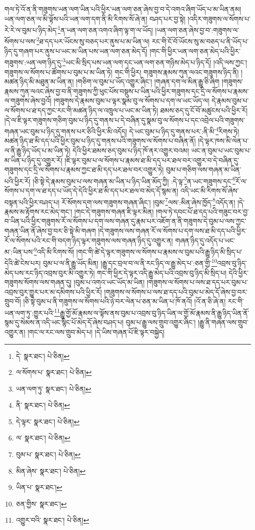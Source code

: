 གལ་ཏེ་འོ་ན་ནི་གཟུགས་ཡན་ལག་ཡིན་པའི་ཕྱིར་ཡན་ལག་ཅན་ཞེས་བྱ་བ་དེ་འགའ་ཞིག་ཡོད་པ་མ་ཡིན་ནམ། ཡན་ལག་ཅན་ལ་མི་ལྟོས་པའི་ཡན་ལག་དག་ནི་མི་རིགས་སོ་ཞེ་ན། བཤད་པར་བྱ་སྟེ། །འདིར་གཟུགས་ལ་སོགས་པ་རེ་རེ་ལ་བུམ་པ་ཉིད་མེད་\footnote{དེ་  སྣར་ཐང་།  པེ་ཅིན། }ན་ཡན་ལག་ཅན་འགའ་ཞིག་ལྟ་ག་ལ་ཡོད། །ཡན་ལག་ཅན་ཞེས་བྱ་བ་:གཟུགས་ལ་སོགས་པ་ལས་\footnote{ལ་སོགས་པ་  སྣར་ཐང་།  པེ་ཅིན། }ཐ་དད་པར་ཡོངས་སུ་བཅད་པར་ནུས་པ་མ་ཡིན་ལ། རང་གི་ངོ་བོ་ཡོངས་སུ་མ་བཅད་པ་ནི་ཡོད་པ་ཉིད་དུ་གཞག་པར་ནུས་པ་ཡང་མ་ཡིན་པས་ཡན་ལག་ཅན་མེད་དོ། །གང་གི་ཕྱིར་ཡན་ལག་ཅན་མེད་པའི་ཕྱིར་གཟུགས་:ཡན་ལག་ཉིད་དུ་\footnote{ཡན་ལག་ཏུ་  སྣར་ཐང་།  པེ་ཅིན། }ཡང་མི་སྲིད་པས་ཡན་ལག་དང་ཡན་ལག་ཅན་གཉིས་མེད་པ་ཉིད་དོ། །འདི་ལས་ཀྱང་། གཟུགས་ལ་སོགས་པ་ཚོགས་པ་བུམ་པ་མ་ཡིན་ཏེ། གང་གི་ཕྱིར། གཟུགས་རྣམས་ཀུན་ལའང་གཟུགས་ཉིད་ནི། །མཚན་ཉིད་མི་མཐུན་མ་ཡིན་ན། །གཅིག་ལ་བུམ་པ་ཡོད་འགྱུར་ཞིང་། །གཞན་དག་ལ་མིན་རྒྱུ་ཅི་ཞིག །གཟུགས་རྣམས་ཀུན་ལའང་ཞེས་བྱ་བ་ནི་གཟུགས་ཀྱི་ཕུང་པོས་བསྡུས་པ་ཡིན་པའི་ཕྱིར་གཟུགས་དང་དྲི་ལ་སོགས་པ་རྣམས་ལ་གཟུགས་ཞེས་བྱའོ། །གཟུགས་དེ་རྣམས་བུམ་པ་ལྟར་སྣམ་བུ་ལ་སོགས་པ་དག་ལ་ཡང་ཡོད་ལ། དེ་རྣམས་བུམ་པ་ལ་སོགས་པ་ཐ་དད་ཀྱང་རང་གི་མཚན་ཉིད་ལ་འཁྲུལ་པ་ཡང་མ་ཡིན་ཏེ། ཐམས་ཅད་དུ་ངོ་བོ་མཚུངས་པའི་ཕྱིར་རོ། །དེ་ལ་ཇི་ལྟར་གཟུགས་གཅིག་བུམ་པ་ཉིད་དུ་གནས་པ་དེ་བཞིན་དུ་སྣམ་བུ་ལ་སོགས་པ་དང་འབྲེལ་པའི་གཟུགས་གཞན་ཡང་བུམ་པ་ཉིད་དུ་གནས་པར་ཅིའི་ཕྱིར་མི་འདོད། དེ་ཡང་བུམ་པ་ཉིད་དུ་གནས་པར་:ནི་མི་\footnote{ནི་  སྣར་ཐང་།  པེ་ཅིན། }རིགས་ཏེ། མཚན་ཉིད་ཐ་མི་དད་པའི་ཕྱིར་བུམ་པ་ཉིད་དུ་གནས་པའི་གཟུགས་ལ་སོགས་པ་བཞིན་ནོ། །དེ་ལྟར་ཁས་མི་ལེན་པ་ལ་ནི་རྒྱུ་ཉིད་ཡོད་པ་མ་ཡིན་ཏེ། དེའི་ཕྱིར་ཐམས་ཅད་བུམ་པ་ཉིད་ཁོ་ནར་འགྱུར་བའམ། ཡང་ན་བུམ་པ་ཡང་བུམ་པ་མ་ཡིན་པ་ཉིད་དུ་འགྱུར་རོ། །ཇི་ལྟར་བུམ་པ་ལ་སོགས་པ་རྣམས་ཐ་མི་དད་པར་ཐལ་བར་འགྱུར་བ་དེ་བཞིན་དུ་གཟུགས་དང་དྲི་ལ་སོགས་པ་རྣམས་ཀྱང་ཐ་མི་དད་པར་ཐལ་བར་འགྱུར་ཏེ། བུམ་པ་གཅིག་ལས་གཞན་མ་ཡིན་པའི་ཕྱིར་རོ། །ཅི་སྟེ་དེ་རྣམས་བུམ་པ་ལས་གཞན་མ་ཡིན་པ་ཉིད་ཡིན་མོད་ཀྱི། :དེ་ལྟ་\footnote{དེ་ལྟར་  སྣར་ཐང་།  པེ་ཅིན། }ན་ཡང་གཟུགས་དང་\footnote{ལ་  སྣར་ཐང་།  པེ་ཅིན། }རོ་ལ་སོགས་པ་དག་ལ་ཐ་དད་པ་ཡོད་དེ་དེའི་ཕྱིར་ཐ་མི་དད་པར་ཐལ་བ་མེད་དོ་སྙམ་ན། འདི་ཡང་མི་རིགས་སོ་ཞེས་བསྟན་པའི་ཕྱིར་བཤད་པ། རོ་སོགས་དག་ལས་གཟུགས་གཞན་ཞིང་། །བུམ་\footnote{བུམ་པ་  སྣར་ཐང་།  པེ་ཅིན། }ལས་:མིན་ཞེས་ཁྱོད་\footnote{མིན་ཞེས་  སྣར་ཐང་།  པེ་ཅིན། }འདོད་ན། །དེ་རྣམས་མ་རྟོགས་རང་མེད་གང་། །གང་དེ་གཟུགས་གཞན་ཇི་ལྟར་མིན། །གལ་ཏེ་དབང་པོ་ཐ་དད་པའི་གཟུང་བར་བྱ་བ་ཡིན་པའི་ཕྱིར་གཟུགས་རོ་ལ་སོགས་པ་དག་ལས་གཞན་དུ་རྣམ་པར་འཇོག་ན་ནི་གཟུགས་དེ་བུམ་པ་ལས་ཀྱང་གཞན་ཡིན་ནོ་ཞེས་བྱ་བར་ཅི་སྟེ་མི་གཞག །དེ་གཟུགས་ལས་གཞན་རོ་ལ་སོགས་པ་དག་ལས་ཐ་མི་དད་པའི་ཕྱིར་རོ་ལ་སོགས་པའི་རང་གི་བདག་ཉིད་ལྟར་གཟུགས་ལས་གཞན་ཉིད་དུ་འགྱུར་ན། གཞན་ཉིད་དུ་འདོད་པ་ཡང་མ་:ཡིན་པས་\footnote{ཡིན་པ་  སྣར་ཐང་། }འདི་མི་རིགས་སོ། །གང་གི་ཚེ་དེ་ལྟར་གཟུགས་ལ་སོགས་པ་རྣམས་ལ་བུམ་པའི་རྒྱུ་ཉིད་མི་སྲིད་པ་དེའི་ཚེ་ངེས་པར། བུམ་པ་ལ་ནི་རྒྱུ་ཡོད་མིན། །རྒྱུ་དང་བྲལ་བ་ལ་ནི་རང་ཉིད་ལ་རྒྱུ་མེད་པ་:ཅན་གྱི་\footnote{ཅན་གྱིས་  སྣར་ཐང་། }འབྲས་བུ་ཉིད་མེད་པས་རང་ཉིད་འབྲས་བུར་མི་འགྱུར་ཏེ། གང་གི་ཕྱིར་དེ་ལྟར་འདི་རྒྱུ་མེད་པའི་འབྲས་བུ་ཉིད་མི་སྲིད་པ། དེའི་ཕྱིར་གཟུགས་སོགས་ལས་གཞན་དུ། །བུམ་པ་འགའ་ཡང་ཡོད་མ་ཡིན། །གཟུགས་ལ་སོགས་པ་ལས་ཐ་དད་པར་བུམ་པ་འབྲས་བུར་གྱུར་པར་མ་དམིགས་པའི་ཕྱིར་རོ། །གཟུགས་ལ་སོགས་པ་ལས་ཐ་དད་པའི་བུམ་པ་མེད་དོ་ཞེས་བྱ་བར་གྲུབ་བོ། །ཅི་སྟེ་བུམ་པ་ནི་གཟུགས་ལ་སོགས་པའི་ཉེ་བར་ལེན་པ་ཅན་མ་ཡིན་པ་ཁོ་ནའོ། །འོ་ན་ཅི་ཞེ་ན། རང་གི་ཡན་ལག་ཏུ་:གྱུར་པའི་\footnote{འགྱུར་བའི་  སྣར་ཐང་།  པེ་ཅིན། }རྒྱུ་གྱོ་མོ་རྣམས་ལ་ལྟོས་ནས་བུམ་པ་འབྲས་བུ་ཉིད་ཡིན་ལ་གྱོ་མོ་རྣམས་ནི་རྒྱུ་ཉིད་ཡིན་ནོ་སྙམ་དུ་སེམས་ན་འདི་ཡང་སྙིང་པོ་མེད་དོ་ཞེས་བཤད་པ། བུམ་པ་རྒྱུ་ལས་གྲུབ་འགྱུར་ཞིང་། །རྒྱུ་ནི་གཞན་ལས་གྲུབ་འགྱུར་ན། །གང་ལ་རང་ལས་གྲུབ་མེད་པ། །དེ་ཡིས་གཞན་པོ་ཇི་ལྟར་བསྐྱེད། 